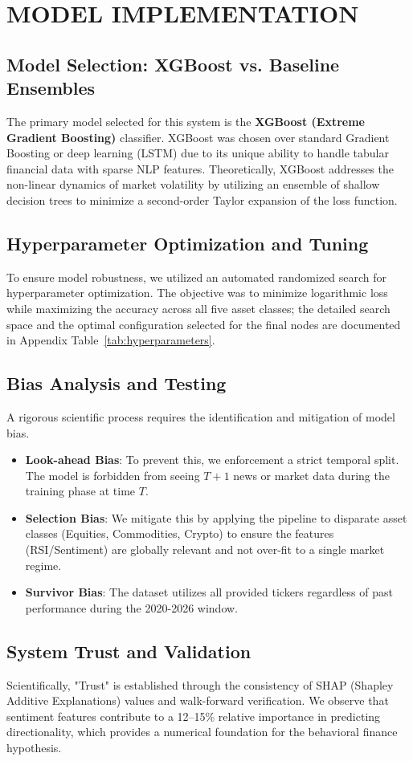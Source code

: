 \chapter{MODEL IMPLEMENTATION}

\section{Model Selection: XGBoost vs. Baseline Ensembles}
The primary model selected for this system is the \textbf{XGBoost (Extreme Gradient Boosting)} classifier. XGBoost was chosen over standard Gradient Boosting or deep learning (LSTM) due to its unique ability to handle tabular financial data with sparse NLP features. Theoretically, XGBoost addresses the non-linear dynamics of market volatility \citep{chen2016} by utilizing an ensemble of shallow decision trees to minimize a second-order Taylor expansion of the loss function.

\section{Hyperparameter Optimization and Tuning}
To ensure model robustness, we utilized an automated randomized search for hyperparameter optimization. The objective was to minimize logarithmic loss while maximizing the accuracy across all five asset classes; the detailed search space and the optimal configuration selected for the final nodes are documented in Appendix Table~\ref{tab:hyperparameters}.

\section{Bias Analysis and Testing}
A rigorous scientific process requires the identification and mitigation of model bias.
\begin{itemize}
    \item \textbf{Look-ahead Bias}: To prevent this, we enforcement a strict temporal split. The model is forbidden from seeing $T+1$ news or market data during the training phase at time $T$.
    \item \textbf{Selection Bias}: We mitigate this by applying the pipeline to disparate asset classes (Equities, Commodities, Crypto) to ensure the features (RSI/Sentiment) are globally relevant and not over-fit to a single market regime.
    \item \textbf{Survivor Bias}: The dataset utilizes all provided tickers regardless of past performance during the 2020-2026 window.
\end{itemize}

\section{System Trust and Validation}
Scientifically, "Trust" is established through the consistency of SHAP (Shapley Additive Explanations) values and walk-forward verification. We observe that sentiment features contribute to a 12--15\% relative importance in predicting directionality, which provides a numerical foundation for the behavioral finance hypothesis.
